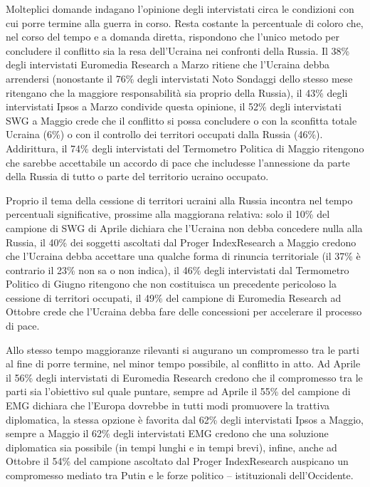 \documentclass[
]{book}
\begin{document}
Molteplici domande indagano l'opinione degli intervistati circa le condizioni con cui porre termine alla guerra in corso. Resta costante la percentuale di coloro che, nel corso del tempo e a domanda diretta, rispondono che l'unico metodo per concludere il conflitto sia la resa dell'Ucraina nei confronti della Russia. Il 38\% degli intervistati Euromedia Research a Marzo ritiene che l'Ucraina debba arrendersi (nonostante il 76\% degli intervistati Noto Sondaggi dello stesso mese ritengano che la maggiore responsabilità sia proprio della Russia), il 43\% degli intervistati Ipsos a Marzo condivide questa opinione, il 52\% degli intervistati SWG a Maggio crede che il conflitto si possa concludere o con la sconfitta totale Ucraina (6\%) o con il controllo dei territori occupati dalla Russia (46\%). Addirittura, il 74\% degli intervistati del Termometro Politica di Maggio ritengono che sarebbe accettabile un accordo di pace che includesse l'annessione da parte della Russia di tutto o parte del territorio ucraino occupato.

Proprio il tema della cessione di territori ucraini alla Russia incontra nel tempo percentuali significative, prossime alla maggiorana relativa: solo il 10\% del campione di SWG di Aprile dichiara che l'Ucraina non debba concedere nulla alla Russia, il 40\% dei soggetti ascoltati dal Proger IndexResearch a Maggio credono che l'Ucraina debba accettare una qualche forma di rinuncia territoriale (il 37\% è contrario il 23\% non sa o non indica), il 46\% degli intervistati dal Termometro Politico di Giugno ritengono che non costituisca un precedente pericoloso la cessione di territori occupati, il 49\% del campione di Euromedia Research ad Ottobre crede che l'Ucraina debba fare delle concessioni per accelerare il processo di pace.

Allo stesso tempo maggioranze rilevanti si augurano un compromesso tra le parti al fine di porre termine, nel minor tempo possibile, al conflitto in atto. Ad Aprile il 56\% degli intervistati di Euromedia Research credono che il compromesso tra le parti sia l'obiettivo sul quale puntare, sempre ad Aprile il 55\% del campione di EMG dichiara che l'Europa dovrebbe in tutti modi promuovere la trattiva diplomatica, la stessa opzione è favorita dal 62\% degli intervistati Ipsos a Maggio, sempre a Maggio il 62\% degli intervistati EMG credono che una soluzione diplomatica sia possibile (in tempi lunghi e in tempi brevi), infine, anche ad Ottobre il 54\% del campione ascoltato dal Proger IndexResearch auspicano un compromesso mediato tra Putin e le forze politico -- istituzionali dell'Occidente.
\end{document}
